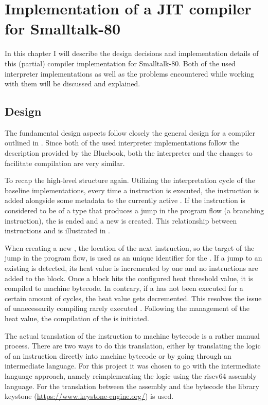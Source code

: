 \chapter{Implementation of a JIT compiler for Smalltalk-80}
In this chapter I will describe the design decisions and implementation details of this (partial) \jit{} compiler implementation for Smalltalk-80. Both of the used interpreter implementations as well as the problems encountered while working with them will be discussed and explained.  

\section{Design}
The fundamental design aspects follow closely the general design for a \jit{} compiler outlined in .
Since both of the used interpreter implementations follow the description provided by the Bluebook, both the interpreter and the changes to facilitate \jit{} compilation are very similar. 

To recap the high-level structure again. Utilizing the interpretation cycle of the baseline implementations, every time a instruction is executed, the instruction is added alongside some metadata to the currently active \bb{}. If the instruction is considered to be of a type that produces a jump in the program flow (a branching instruction), the \bb{} is ended and a new \bb{} is created. This relationship between instructions and \bbs{} is illustrated in . 


When creating a new \bb{}, the location of the next instruction, so the target of the jump in the program flow, is used as an unique identifier for the \bb{}. 
If a jump to an existing \bb{} is detected, its heat value is incremented by one and no instructions are added to the block. 
Once a block hits the configured heat threshold value, it is compiled to machine bytecode. In contrary, if a \bb{} has not been executed for a certain amount of cycles, the heat value gets decremented. This resolves the issue of unnecessarily compiling rarely executed \bbs{}. 
Following the management of the heat value, the compilation of the \bb{} is initiated.

The actual translation of the instruction to machine bytecode is a rather manual process. There are two ways to do this translation, either by translating the logic of an instruction directly into machine bytecode or by going through an intermediate language. For this project it was chosen to go with the intermediate language approach, namely reimplementing the logic using the riscv64 assembly language. For the translation between the assembly and the bytecode the library keystone (\url{https://www.keystone-engine.org/}) is used.

